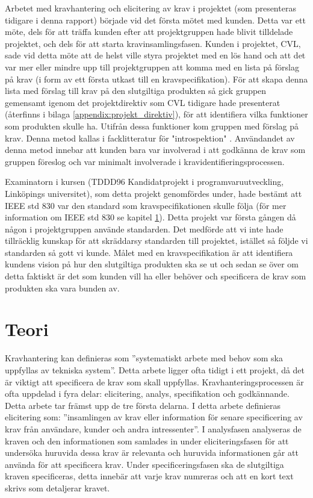 Arbetet med kravhantering och elicitering av krav i projektet (som presenteras tidigare i denna rapport) började vid det första mötet med kunden. Detta var ett möte, dels för att träffa kunden efter att projektgruppen hade blivit tilldelade projektet, och dels för att starta kravinsamlingsfasen. Kunden i projektet, CVL, sade vid detta möte att de helst ville styra projektet med en lös hand och att det var mer eller mindre upp till projektgruppen att komma med en lista på förslag på krav (i form av ett första utkast till en kravspecifikation). För att skapa denna lista med förslag till krav på den slutgiltiga produkten så gick gruppen gemensamt igenom det projektdirektiv som CVL tidigare hade presenterat (återfinns i bilaga \ref{appendix:projekt_direktiv}), för att identifiera vilka funktioner som produkten skulle ha. Utifrån dessa funktioner kom gruppen med förslag på krav. Denna metod kallas i facklitteratur för "introspektion" \cite{goguen1993techniques}. Användandet av denna metod innebar att kunden bara var involverad i att godkänna de krav som gruppen föreslog och var minimalt involverade i kravidentifieringsprocessen. 

Examinatorn i kursen (TDDD96 Kandidatprojekt i programvaruutveckling, Linköpings universitet), som detta projekt genomfördes under, hade bestämt att IEEE std 830 var den standard som kravspecifikationen skulle följa (för mer information om IEEE std 830 se kapitel \ref{sec:theory-jannering}). Detta projekt var första gången då någon i projektgruppen använde standarden. Det medförde att vi inte hade tillräcklig kunskap för att skräddarsy standarden till projektet, istället så följde vi standarden så gott vi kunde. Målet med en kravspecifikation är att identifiera kundens vision på hur den slutgiltiga produkten ska se ut och sedan se över om detta faktiskt är det som kunden vill ha eller behöver och specificera de krav som produkten ska vara bunden av. 


\section{Teori}
\label{sec:theory-jannering}
Kravhantering kan definieras som ”systematiskt arbete med behov som ska uppfyllas av tekniska system”. Detta arbete ligger ofta tidigt i ett projekt, då det är viktigt att specificera de krav som skall uppfyllas. Kravhanteringsprocessen är ofta uppdelad i fyra delar: elicitering, analys, specifikation och godkännande. Detta arbete tar främst upp de tre första delarna. I detta arbete definieras elicitering som: ”insamlingen av krav eller information för senare specificering av krav från användare, kunder och andra intressenter”. I analysfasen analyseras de kraven och den informationen som samlades in under eliciteringsfasen för att undersöka huruvida dessa krav är relevanta och huruvida informationen går att använda för att specificera krav. Under specificeringsfasen ska de slutgiltiga kraven specificeras, detta innebär att varje krav numreras och att en kort text skrivs som detaljerar kravet.
